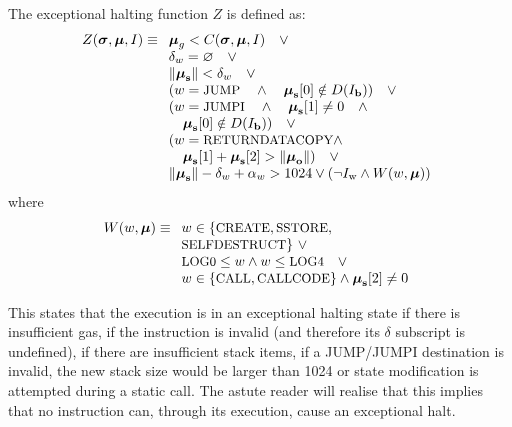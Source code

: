 \documentclass[9pt,oneside]{amsart}
\begin{document}
\begin{multicols}{2}
The exceptional halting function $Z$ is defined as:
\begin{equation}
Z(\boldsymbol{\sigma}, \boldsymbol{\mu}, I) \equiv
\begin{array}[t]{l}
\boldsymbol{\mu}_g < C(\boldsymbol{\sigma}, \boldsymbol{\mu}, I) \quad \vee \\
\mathbf{\delta}_w = \varnothing \quad \vee \\
\lVert\boldsymbol{\mu}_\mathbf{s}\rVert < \mathbf{\delta}_w \quad \vee \\
( w = \text{\small JUMP} \quad \wedge \quad \boldsymbol{\mu}_\mathbf{s}[0] \notin D(I_\mathbf{b}) ) \quad \vee \\
( w = \text{\small JUMPI} \quad \wedge \quad \boldsymbol{\mu}_\mathbf{s}[1] \neq 0 \quad \wedge \\
\quad \boldsymbol{\mu}_\mathbf{s}[0] \notin D(I_\mathbf{b}) ) \quad \vee \\
( w = \text{\small RETURNDATACOPY} \wedge \\ \quad \boldsymbol{\mu}_{\mathbf{s}}[1] + \boldsymbol{\mu}_{\mathbf{s}}[2] > \lVert\boldsymbol{\mu}_{\mathbf{o}}\rVert) \quad \vee \\
\lVert\boldsymbol{\mu}_\mathbf{s}\rVert - \mathbf{\delta}_w + \mathbf{\alpha}_w > 1024 \vee
 (\neg I_{\mathrm{w}} \wedge W(w, \boldsymbol{\mu}))
\end{array}
\end{equation}
where
\begin{equation}
W(w, \boldsymbol{\mu}) \equiv \\
\begin{array}[t]{l}
w \in \{\text{\small CREATE}, \text{\small SSTORE},\\ \text{\small SELFDESTRUCT}\} \ \vee \\
\text{\small LOG0} \le w \wedge w \le \text{\small LOG4} \quad \vee \\
w \in \{\text{\small CALL}, \text{\small CALLCODE}\} \wedge \boldsymbol{\mu}_{\mathbf{s}}[2] \neq 0
\end{array}
\end{equation}

This states that the execution is in an exceptional halting state if there is insufficient gas, if the instruction is invalid (and therefore its $\delta$ subscript is undefined), if there are insufficient stack items, if a {\small JUMP}/{\small JUMPI} destination is invalid, the new stack size would be larger than 1024 or state modification is attempted during a static call. The astute reader will realise that this implies that no instruction can, through its execution, cause an exceptional halt.


\end{multicols}
\end{document}
